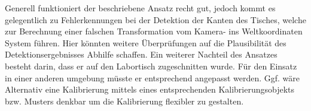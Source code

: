 Generell funktioniert der beschriebene Ansatz recht gut, jedoch kommt es gelegentlich zu Fehlerkennungen bei der Detektion der Kanten des Tisches, welche zur Berechnung einer falschen Transformation vom Kamera- ins Weltkoordinaten System führen. Hier könnten weitere Überprüfungen auf die Plausibilität des Detektionsergebnisses Abhilfe schaffen.
Ein weiterer Nachteil des Ansatzes besteht darin, dass er auf den Labortisch zugeschnitten wurde. Für den Einsatz in einer anderen umgebung müsste er entsprechend angepasst werden. Ggf. wäre Alternativ eine Kalibrierung mittels eines entsprechenden Kalibrierungsobjekts bzw. Musters denkbar um die Kalibrierung flexibler zu gestalten.